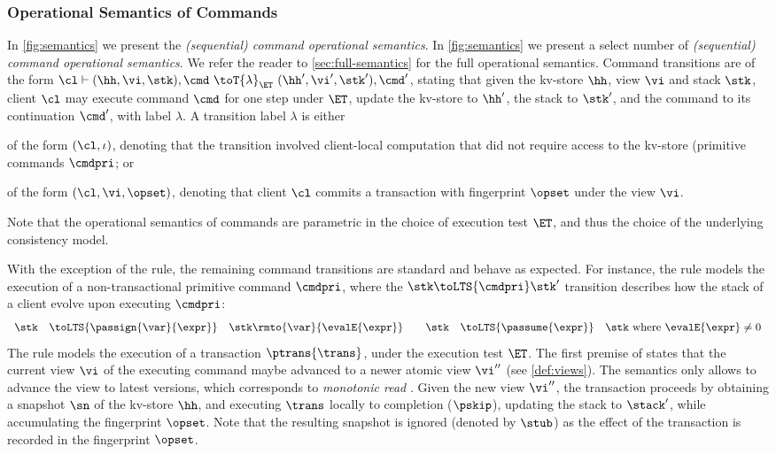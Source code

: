 \subsubsection{Operational Semantics of Commands}
\ifTechReport%
In \cref{fig:semantics} we present the \emph{(sequential) command operational semantics}.
\else%
In \cref{fig:semantics} we present a select number of \emph{(sequential) command operational semantics}.
We refer the reader to \cref{sec:full-semantics} for the full operational semantics.
\fi%
Command transitions are of the form $\cl \vdash (\hh, \vi, \stk), \cmd \ \toT{\lambda}_{\ET} \ (\hh', \vi', \stk') , \cmd'$, 
stating that given the kv-store $\hh$, view $\vi$ and stack $\stk$, client $\cl$ may execute command $\cmd$ for one step under $\ET$, update the kv-store to $\hh'$, the stack to $\stk'$, and the command to its continuation $\cmd'$, with label $\lambda$.
A transition label $\lambda$ is either
\begin{enumerate*}
	\item of the form $(\cl, \iota)$, denoting that the transition involved 
client-local computation that did not require access to the kv-store (\eg primitive commands $\cmdpri$; or
	\item of the form $(\cl, \vi, \opset)$, denoting that client $\cl$ commits a transaction with fingerprint $\opset$ under the view $\vi$.
\end{enumerate*}
Note that the operational semantics of commands are parametric in the choice of execution test $\ET$, 
and thus the choice of the underlying consistency model.


With the exception of the  rule, the remaining command transitions are standard and behave as expected. 
For instance, the  rule models the execution of a non-transactional primitive command $\cmdpri$, where the $\stk \toLTS{\cmdpri} \stk'$ transition describes how the stack of a client 
evolve upon executing $\cmdpri$:
\[
\begin{array}{rcl @{\qquad} rcl}
\stk  & \toLTS{\passign{\var}{\expr}} & \stk\rmto{\var}{\evalE{\expr}} &
\stk  & \toLTS{\passume{\expr}} & \stk \text{ where } \evalE{\expr} \neq 0 \\
\end{array}                                                                                               
\]
%
%
The  rule models the execution of a transaction $\ptrans{\trans}$, under the execution test $\ET$. 
The first premise of  states that the current view $\vi$ of the executing command maybe advanced to a newer atomic view $\vi''$ (see \cref{def:views}). 
The semantics only allows to advance the view to latest versions, which corresponds to \emph{monotonic read} \cite{.......}.
Given the new view $\vi''$, the transaction proceeds by obtaining a snapshot $\sn$ of the kv-store $\hh$, and executing $\trans$ locally to completion ($\pskip$), updating the stack to $\stack'$, while accumulating the fingerprint $\opset$. Note that the resulting snapshot is ignored (denoted by $\stub$) as the effect of the transaction is recorded in the fingerprint $\opset$. 
%

